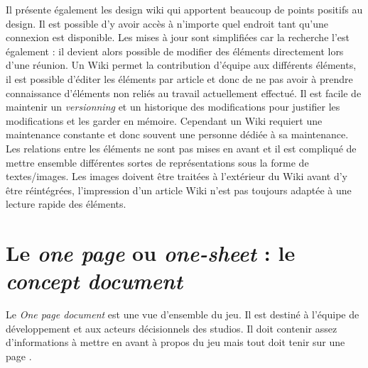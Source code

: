 Il présente également les \guillemotleft design wiki \guillemotright qui apportent beaucoup de points positifs au design. Il est possible d'y avoir accès à n'importe quel endroit tant qu'une connexion est disponible. Les mises à jour sont simplifiées car la recherche l'est également : il devient alors possible de modifier des éléments directement lors d'une réunion. Un Wiki permet la contribution d'équipe aux différents éléments, il est possible d'éditer les éléments par article et donc de ne pas avoir à prendre connaissance d'éléments non reliés au travail actuellement effectué. Il est facile de maintenir un \emph{versionning} et un historique des modifications pour justifier les modifications et les garder en mémoire. Cependant un Wiki requiert une maintenance constante et donc souvent une personne dédiée à sa maintenance. Les relations entre les éléments ne sont pas mises en avant et il est compliqué de mettre ensemble différentes sortes de représentations sous la forme de textes/images. Les images doivent être traitées à l'extérieur du Wiki avant d'y être réintégrées, l'impression d'un article Wiki n'est pas toujours adaptée à une lecture rapide des éléments.\\



\section{Le \emph{\guillemotleft one page \guillemotright} ou \emph{\guillemotleft one-sheet \guillemotright} : le \emph{concept document}}
Le \emph{One page document} est une vue d'ensemble du jeu. Il est destiné à l'équipe de développement et aux acteurs décisionnels des studios. Il doit contenir assez d'informations à mettre en avant à propos du jeu mais tout doit tenir sur une page \cite{LevelUpRogers2014}.

